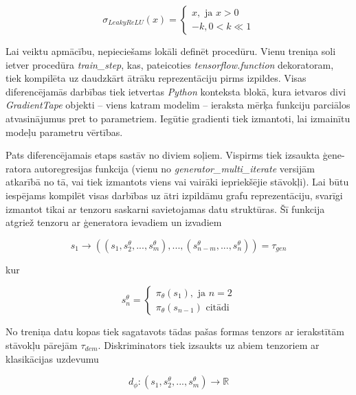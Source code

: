 \documentclass[12pt, a4paper]{article}
\numberwithin{equation}{section} %
\begin{document}
\begin{equation}
    \sigma_{LeakyReLU}(x) = 
    \begin{cases}
        x, \text{ ja } x > 0 \\
        -k, 0 < k \ll 1
    \end{cases}
\end{equation}

Lai veiktu apmācību, nepieciešams lokāli definēt procedūru. Vienu treniņa soli ietver procedūra \textit{train\_step}, kas, pateicoties \textit{tensorflow.function} dekoratoram, tiek kompilēta uz daudzkārt ātrāku reprezentāciju pirms izpildes. Visas diferencējamās darbības tiek ietvertas \textit{Python} konteksta blokā, kura ietvaros divi \textit{GradientTape} objekti -- viens katram modelim -- ieraksta mērķa funkciju parciālos atvasinājumus pret to parametriem. Iegūtie gradienti tiek izmantoti, lai izmainītu modeļu parametru vērtības.

Pats diferencējamais etaps sastāv no diviem soļiem. Vispirms tiek izsaukta ģene-ratora autoregresijas funkcija (vienu no \textit{generator\_multi\_iterate} versijām atkarībā no tā, vai tiek izmantots viens vai vairāki iepriekšējie stāvokļi). Lai būtu iespējams kompilēt visas darbības uz ātri izpildāmu grafu reprezentāciju, svarīgi izmantot tikai ar tenzoru saskarni savietojamas datu struktūras. Šī funkcija atgriež tenzoru ar ģeneratora ievadiem un izvadiem

\begin{equation}
    s_1 \rightarrow \left ( (s_1, s^{\theta}_2 , ..., s^{\theta}_m), ...,  (s^{\theta}_{n-m}, ..., s^{\theta}_{n}) \right ) = \tau_{gen}
\end{equation}

kur

\begin{equation}
    s^{\theta}_n = 
    \begin{cases}
        \pi_{\theta}(s_1), \text{ ja } n = 2 \\
        \pi_{\theta}(s_{n-1}) \text{ citādi}
    \end{cases}
\end{equation}


No treniņa datu kopas tiek sagatavots tādas pašas formas tenzors ar ierakstītām stāvokļu pārejām $\tau_{dem}$. Diskriminators tiek izsaukts uz abiem tenzoriem ar klasikācijas uzdevumu

\begin{equation}
    d_{\phi}: (s_1, s^{\theta}_2 , ..., s^{\theta}_m) \rightarrow \mathbb{R}
\end{equation}
\end{document}
